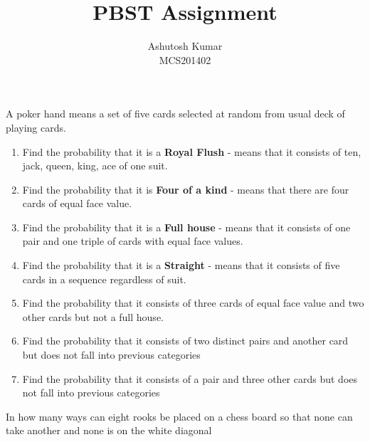 \documentclass[12pt]{article}
\newenvironment{question}[2][Question]{\begin{trivlist}
\item[\hskip \labelsep {\bfseries #1}\hskip \labelsep {\bfseries #2.}]}{\end{trivlist}}
\begin{document}
 
 
\title{PBST Assignment}%
\author{Ashutosh Kumar\\ %
MCS201402} %
 
\maketitle
 
\begin{question}{1}  A poker hand means a set of five cards selected at random from usual deck of playing cards.

    \begin{enumerate}
        \item Find the probability that it is a \textbf{Royal Flush} - means that it consists of ten, jack, queen, king, ace of one suit.
        \item Find the probability that it is \textbf{Four of a kind} - means that there are four cards of equal face value.
        \item Find the probability that it is a \textbf{Full house} - means that it consists of one pair and one triple of cards with equal face values.
        \item Find the probability that it is a \textbf{Straight} - means that it consists of five cards in a sequence regardless of suit.
        \item Find the probability that it consists of three cards of equal face value and two other cards but not a full house.
        \item Find the probability that it consists of two distinct pairs and another card but does not fall into previous categories
        \item Find the probability that it consists of a pair and three other cards but does not fall into previous categories
    \end{enumerate}

\end{question}
 
\begin{question}{2}
In how many ways can eight rooks be placed on a chess board so that none can take another and none is on the white diagonal
\end{question}
\end{document}
